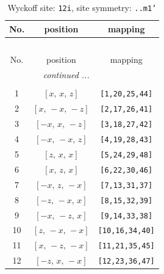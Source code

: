 \documentclass[fleqn,8pt]{jsarticle}
\begin{document}
\begin{longtable}{ccc}
\caption{Wyckoff site: {\tt 12i}, site symmetry: {\tt ..m1'}}
 \\
 \hline \hline
No. & position & mapping \\ \hline \endfirsthead

\multicolumn{2}{l}{\tablename\ \thetable{}} \\
 \hline \hline
No. & position & mapping \\ \hline \endhead

 \hline \hline
\multicolumn{2}{r}{\footnotesize\it continued ...} \\ \endfoot

 \hline \hline
\multicolumn{2}{r}{} \\ \endlastfoot

1 & $\left[ x,\, x,\, z \right]$ & {\tt [1,20,25,44]} \\ \hline
2 & $\left[ x,\, - x,\, - z \right]$ & {\tt [2,17,26,41]} \\ \hline
3 & $\left[ - x,\, x,\, - z \right]$ & {\tt [3,18,27,42]} \\ \hline
4 & $\left[ - x,\, - x,\, z \right]$ & {\tt [4,19,28,43]} \\ \hline
5 & $\left[ z,\, x,\, x \right]$ & {\tt [5,24,29,48]} \\ \hline
6 & $\left[ x,\, z,\, x \right]$ & {\tt [6,22,30,46]} \\ \hline
7 & $\left[ - x,\, z,\, - x \right]$ & {\tt [7,13,31,37]} \\ \hline
8 & $\left[ - z,\, - x,\, x \right]$ & {\tt [8,15,32,39]} \\ \hline
9 & $\left[ - x,\, - z,\, x \right]$ & {\tt [9,14,33,38]} \\ \hline
10 & $\left[ z,\, - x,\, - x \right]$ & {\tt [10,16,34,40]} \\ \hline
11 & $\left[ x,\, - z,\, - x \right]$ & {\tt [11,21,35,45]} \\ \hline
12 & $\left[ - z,\, x,\, - x \right]$ & {\tt [12,23,36,47]} \\
\end{longtable}
\renewcommand{\arraystretch}{1.2}
\end{document}
